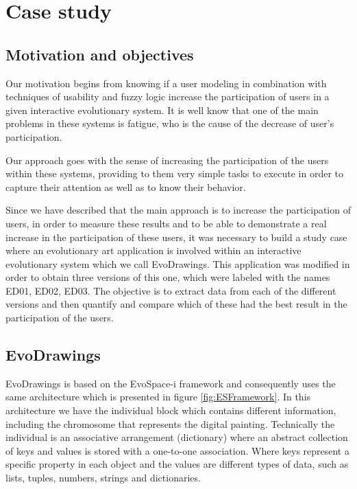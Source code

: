 \chapter{Case study} \label{sec:4}




\section{Motivation and objectives}

Our motivation begins from knowing if a user modeling in combination with
techniques of usability and fuzzy logic increase the participation of users in a
given interactive evolutionary system. It is well know that one of the main
problems in these systems is fatigue, who is the cause of the decrease of user's
participation.

Our approach goes with the sense of increasing the participation of the users
within these systems, providing to them very simple tasks to execute in order to
capture their attention as well as to know their behavior.


Since we have described that the main approach is to increase the participation
of users, in order to measure these results and to be able to demonstrate a real
increase in the participation of these users, it was necessary to build a study
case where an evolutionary art application is involved within an interactive
evolutionary system which we call EvoDrawings. This application was modified in
order to obtain three versions of this one, which were labeled with the names
ED01, ED02, ED03. The objective is to extract data from each of the different
versions and then quantify and compare which of these had the best result in the
participation of the users.

\section{EvoDrawings} EvoDrawings is based on the EvoSpace-i framework and
consequently uses the same architecture which is presented in figure
\ref{fig:ESFramework}. In this architecture we have the individual block which
contains different information, including the chromosome that represents the
digital painting. Technically the individual is an associative arrangement
(dictionary) where an abstract collection of keys and values is stored with a
one-to-one association. Where keys represent a specific property in each object
and the values are different types of data, such as lists, tuples, numbers,
strings and dictionaries.

